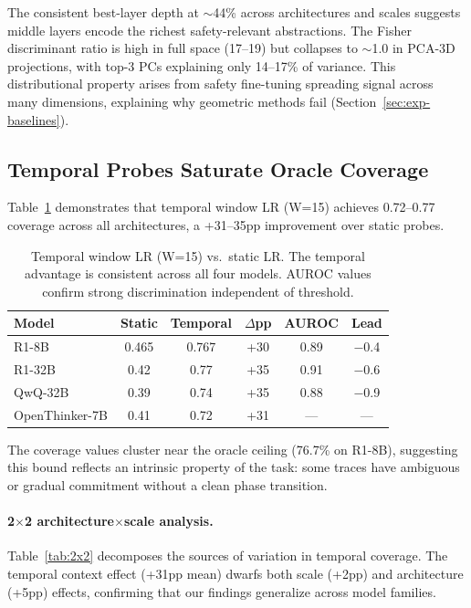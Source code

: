 \documentclass[11pt,a4paper]{article}
\begin{document}
The consistent best-layer depth at $\sim$44\% across architectures and scales suggests middle layers encode the richest safety-relevant abstractions. The Fisher discriminant ratio is high in full space (17--19) but collapses to $\sim$1.0 in PCA-3D projections, with top-3 PCs explaining only 14--17\% of variance. This distributional property arises from safety fine-tuning spreading signal across many dimensions, explaining why geometric methods fail (Section~\ref{sec:exp-baselines}).

\subsection{Temporal Probes Saturate Oracle Coverage}
\label{sec:exp-temporal}

Table~\ref{tab:temporal} demonstrates that temporal window LR (W=15) achieves 0.72--0.77 coverage across all architectures, a +31--35pp improvement over static probes.

\begin{table}[t]
\centering
\small
\begin{tabular}{lccccc}
\toprule
\textbf{Model} & \textbf{Static} & \textbf{Temporal} & \textbf{$\Delta$pp} & \textbf{AUROC} & \textbf{Lead} \\
\midrule
R1-8B & 0.465 & 0.767 & +30 & 0.89 & $-$0.4 \\
R1-32B & 0.42 & 0.77 & +35 & 0.91 & $-$0.6 \\
QwQ-32B & 0.39 & 0.74 & +35 & 0.88 & $-$0.9 \\
OpenThinker-7B & 0.41 & 0.72 & +31 & --- & --- \\
\bottomrule
\end{tabular}
\caption{Temporal window LR (W=15) vs.\ static LR. The temporal advantage is consistent across all four models. AUROC values confirm strong discrimination independent of threshold.}
\label{tab:temporal}
\end{table}

The coverage values cluster near the oracle ceiling (76.7\% on R1-8B), suggesting this bound reflects an intrinsic property of the task: some traces have ambiguous or gradual commitment without a clean phase transition.

\paragraph{2$\times$2 architecture$\times$scale analysis.} Table~\ref{tab:2x2} decomposes the sources of variation in temporal coverage. The temporal context effect (+31pp mean) dwarfs both scale (+2pp) and architecture (+5pp) effects, confirming that our findings generalize across model families.
\end{document}
